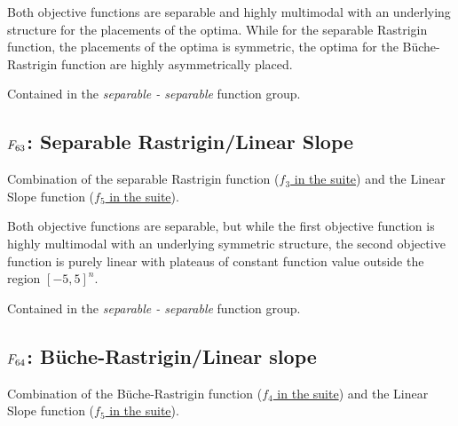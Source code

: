 Both objective functions are separable and highly multimodal with an underlying
structure for the placements of the optima. While for the separable Rastrigin function,
the placements of the optima is symmetric, the optima for the B\"{u}che-Rastrigin function
are highly asymmetrically placed.

Contained in the \emph{separable - separable} function group.



\subsection[\texorpdfstring{\protect\(F_{63}\protect\): Separable Rastrigin/Linear Slope}{F63: Separable Rastrigin/Linear Slope}]{\texorpdfstring{\protect\(F_{63}\protect\): Separable Rastrigin/Linear Slope}{}}
\label{index:separable-rastrigin-linear-slope}\label{index:f63}
Combination of the separable Rastrigin function (\href{https://coco.gforge.inria.fr/downloads/download16.00/bbobdocfunctions.pdf\#page=15}{\(f_3\) in the \bbob suite}) and the
Linear Slope function (\href{https://coco.gforge.inria.fr/downloads/download16.00/bbobdocfunctions.pdf\#page=25}{\(f_5\) in the \bbob suite}).

Both objective functions are separable, but while the first objective function
is highly multimodal with an underlying symmetric structure, the second objective
function is purely linear with plateaus of constant function value outside
the region \([-5,5]^n\).

Contained in the \emph{separable - separable} function group.



\subsection[\texorpdfstring{\protect\(F_{64}\protect\): B\"{u}che-Rastrigin/Linear slope}{F64: B\"{u}che-Rastrigin/Linear slope}]{\texorpdfstring{\protect\(F_{64}\protect\): B\"{u}che-Rastrigin/Linear slope}{}}
\label{index:f64}\label{index:buche-rastrigin-linear-slope}
Combination of the B\"{u}che-Rastrigin function (\href{https://coco.gforge.inria.fr/downloads/download16.00/bbobdocfunctions.pdf\#page=20}{\(f_4\) in the \bbob suite}) and the
Linear Slope function (\href{https://coco.gforge.inria.fr/downloads/download16.00/bbobdocfunctions.pdf\#page=25}{\(f_5\) in the \bbob suite}).

